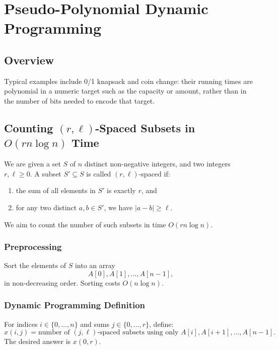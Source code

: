 \documentclass[9pt]{extarticle}
\begin{document}
\section{Pseudo-Polynomial Dynamic Programming}

\subsection{Overview}

Typical examples include 0/1 knapsack and coin change: their running times are
polynomial in a numeric target such as the capacity or amount, rather than in
the number of bits needed to encode that target.

\subsection{Counting $(r,\ell)$-Spaced Subsets in $O(rn \log n)$ Time}

We are given a set \(S\) of \(n\) distinct non-negative integers, and two integers
\(r,\ell \ge 0\). A subset \(S' \subseteq S\) is called \((r,\ell)\)-spaced if:
\begin{enumerate}
    \item the sum of all elements in \(S'\) is exactly \(r\), and
    \item for any two distinct \(a,b \in S'\), we have \(|a-b| \ge \ell\).
\end{enumerate}
We aim to count the number of such subsets in time \(O(rn \log n)\).

\subsubsection*{Preprocessing}
Sort the elements of \(S\) into an array
\[
A[0], A[1], \ldots, A[n-1],
\]
in non-decreasing order. Sorting costs \(O(n \log n)\).

\subsubsection*{Dynamic Programming Definition}
For indices \(i \in \{0,\ldots,n\}\) and sums \(j \in \{0,\ldots,r\}\), define:
\[
x(i,j) = \text{number of } (j,\ell)\text{-spaced subsets using only }
A[i],A[i+1],\ldots,A[n-1].
\]
The desired answer is \(x(0,r)\).
\end{document}
